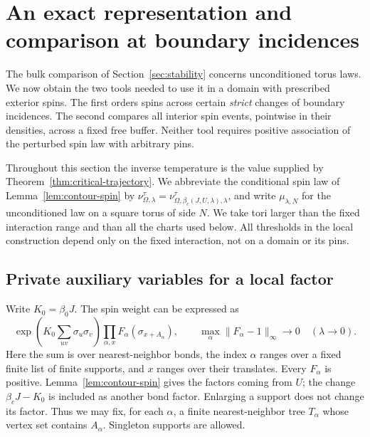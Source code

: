 \section{An exact representation and comparison at boundary incidences}
\label{sec:comparison}

The bulk comparison of Section~\ref{sec:stability} concerns unconditioned
torus laws.  We now obtain the two tools needed to use it in a domain with
prescribed exterior spins.  The first orders spins across certain
\emph{strict} changes of boundary incidences.  The second compares all
interior spin events, pointwise in their densities, across a fixed free
buffer.  Neither tool requires positive association of the perturbed spin
law with arbitrary pins.

Throughout this section the inverse temperature is the value supplied by
Theorem~\ref{thm:critical-trajectory}.  We abbreviate the conditional spin
law of Lemma~\ref{lem:contour-spin} by
\(\nu_{\Omega,\lambda}^{\tau}
=\nu_{\Omega,\beta_c(J,U,\lambda),\lambda}^{\tau}\),
and write \(\mu_{\lambda,N}\) for the unconditioned law on a square torus
of side \(N\).  We take tori larger than the fixed interaction range and
than all the charts used below.  All thresholds in the local construction
depend only on the fixed interaction, not on a domain or its pins.

\subsection{Private auxiliary variables for a local factor}

Write \(K_0=\beta_0J\).  The spin weight can be expressed as
\begin{equation}
 \exp\left(K_0\sum_{uv}\sigma_u\sigma_v\right)
 \prod_{\alpha,x}F_\alpha(\sigma_{x+A_\alpha}),
 \qquad
 \max_\alpha\|F_\alpha-1\|_\infty\longrightarrow0
 \quad(\lambda\longrightarrow0).
 \label{eq:comparison-local-factors}
\end{equation}
Here the sum is over nearest-neighbor bonds, the index \(\alpha\) ranges
over a fixed finite list of finite supports, and \(x\) ranges over their
translates.  Every \(F_\alpha\) is positive.  Lemma~\ref{lem:contour-spin}
gives the factors coming from \(U\); the change
\(\beta_cJ-K_0\) is included as another bond factor.  Enlarging a support
does not change its factor.  Thus we may fix, for each \(\alpha\), a finite
nearest-neighbor tree \(T_\alpha\) whose vertex set contains \(A_\alpha\).
Singleton supports are allowed.

